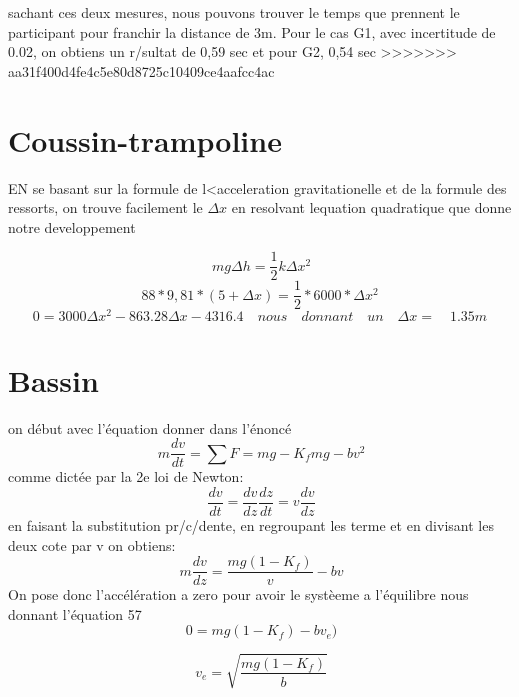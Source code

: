 \documentclass{article}
\begin{document}
 sachant ces deux mesures, nous pouvons trouver le temps que prennent le participant pour franchir la distance de 3m. Pour le cas G1, avec incertitude de 0.02, on obtiens un r/sultat de 0,59 sec et pour G2, 0,54 sec
>>>>>>> aa31f400d4fe4c5e80d8725c10409ce4aafcc4ac

\section{Coussin-trampoline}
 EN se basant sur la formule de l<acceleration gravitationelle et de la formule des ressorts, on trouve facilement le $\Delta x$ en resolvant lequation quadratique que donne notre developpement
 
 \begin{equation}
\ mg \Delta h = \frac{1}{2}k \Delta x ^2
 \end{equation}
 \begin{equation}
 88*9,81*(5+\Delta x) = \frac{1}{2}*6000*\Delta x^2 
 \end{equation}
 \begin{equation}
 0 = 3000\Delta x^2 - 863.28 \Delta x - 4316.4 \quad nous\quad  donnant\quad  un\quad  \Delta x=\quad 1.35m 
 \end{equation}
 
\section{Bassin}
on début avec l'équation donner dans l'énoncé
\begin{equation}
\ m \frac{dv}{dt} = \sum F = mg - K_{f}mg - bv^2
\end{equation}
comme dictée par la 2e loi de Newton:
\begin{equation}
\ \frac{dv}{dt} = \frac{dv}{dz} \frac{dz}{dt} = v\frac{dv}{dz}
\end{equation}
en faisant la substitution pr/c/dente, en regroupant les terme et en divisant les deux cote par v on obtiens:
\begin{equation}
\ m\frac{dv}{dz} =  \frac{mg ( 1- K_{f})}{v} - bv
\end{equation}
On pose donc l'accélération a zero pour avoir le systèeme a l'équilibre nous donnant l'équation 57
\begin{equation}
\ 0 =  mg ( 1- K_{f}) - bv_{e})
\end{equation}

\begin{equation}
\ v_{e} = \sqrt{\frac{mg(1-K_{f})}{b}}
\end{equation}
\end{document}
